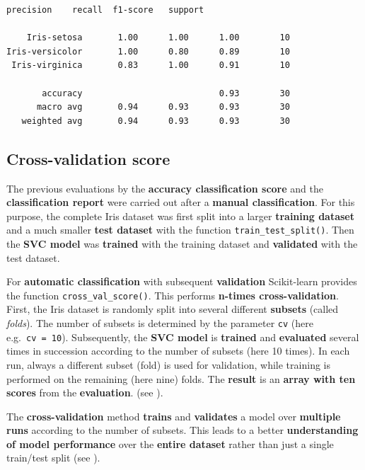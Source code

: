 \documentclass [oneside,10pt,a4paper,ngerman,BCOR10mm,headsepline,parindent,final]{scrartcl}
\begin{document}
    \begin{Verbatim}[commandchars=\\\{\}]
                 precision    recall  f1-score   support

    Iris-setosa       1.00      1.00      1.00        10
Iris-versicolor       1.00      0.80      0.89        10
 Iris-virginica       0.83      1.00      0.91        10

       accuracy                           0.93        30
      macro avg       0.94      0.93      0.93        30
   weighted avg       0.94      0.93      0.93        30

    \end{Verbatim}

    \hypertarget{cross-validation-score}{%
\subsection{Cross-validation score}\label{cross-validation-score}}

The previous evaluations by the \textbf{accuracy classification score}
and the \textbf{classification report} were carried out after a
\textbf{manual classification}. For this purpose, the complete Iris
dataset was first split into a larger \textbf{training dataset} and a
much smaller \textbf{test dataset} with the function
\texttt{train\_test\_split()}. Then the \textbf{SVC model} was
\textbf{trained} with the training dataset and \textbf{validated} with
the test dataset.

For \textbf{automatic classification} with subsequent
\textbf{validation} Scikit-learn provides the function
\texttt{cross\_val\_score()}. This performs \textbf{n-times
cross-validation}. First, the Iris dataset is randomly split into
several different \textbf{subsets} (called \emph{folds}). The number of
subsets is determined by the parameter \texttt{cv} (here
e.g.~\texttt{cv\ =\ 10}). Subsequently, the \textbf{SVC model} is
\textbf{trained} and \textbf{evaluated} several times in succession
according to the number of subsets (here 10 times). In each run, always
a different subset (fold) is used for validation, while training is
performed on the remaining (here nine) folds. The \textbf{result} is an
\textbf{array with ten scores} from the \textbf{evaluation}. (see
\cite{Geron_2018}).

The \textbf{cross-validation} method \textbf{trains} and
\textbf{validates} a model over \textbf{multiple runs} according to the
number of subsets. This leads to a better \textbf{understanding of model
performance} over the \textbf{entire dataset} rather than just a single
train/test split (see \cite{cross_val_score_2022}).
\end{document}
